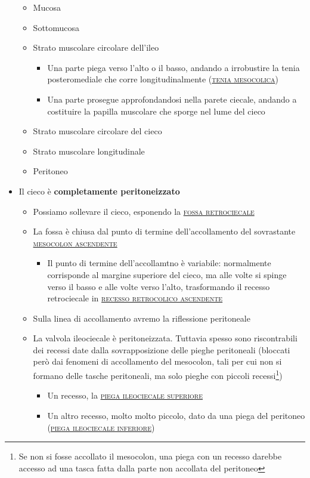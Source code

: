 \documentclass[italian,]{article}
\providecommand{\tightlist}{%
  \setlength{\itemsep}{0pt}\setlength{\parskip}{0pt}}
\renewcommand{\a}[1]{\underline{\textsc{#1}}}
\begin{document}
\begin{itemize}
  \begin{itemize}
  \tightlist
  \item
    Mucosa
  \item
    Sottomucosa
  \item
    Strato muscolare circolare dell'ileo

    \begin{itemize}
    \tightlist
    \item
      Una parte piega verso l'alto o il basso, andando a irrobustire la
      tenia posteromediale che corre longitudinalmente
      (\a{tenia mesocolica})
    \item
      Una parte prosegue approfondandosi nella parete ciecale, andando a
      costituire la papilla muscolare che sporge nel lume del cieco
    \end{itemize}
  \item
    Strato muscolare circolare del cieco
  \item
    Strato muscolare longitudinale
  \item
    Peritoneo
  \end{itemize}
\item
  Il cieco è \textbf{completamente peritoneizzato}

  \begin{itemize}
  \tightlist
  \item
    Possiamo sollevare il cieco, esponendo la \a{fossa retrociecale}
  \item
    La fossa è chiusa dal punto di termine dell'accollamento del
    sovrastante \a{mesocolon ascendente}

    \begin{itemize}
    \tightlist
    \item
      Il punto di termine dell'accollamtno è variabile: normalmente
      corrisponde al margine superiore del cieco, ma alle volte si
      spinge verso il basso e alle volte verso l'alto, trasformando il
      recesso retrociecale in \a{recesso retrocolico ascendente}
    \end{itemize}
  \item
    Sulla linea di accollamento avremo la riflessione peritoneale
  \item
    La valvola ileociecale è peritoneizzata. Tuttavia spesso sono
    riscontrabili dei recessi date dalla sovrapposizione delle pieghe
    peritoneali (bloccati però dai fenomeni di accollamento del
    mesocolon, tali per cui non si formano delle tasche peritoneali, ma
    solo pieghe con piccoli recessi\footnote{Se non si fosse accollato
      il mesocolon, una piega con un recesso darebbe accesso ad una
      tasca fatta dalla parte non accollata del peritoneo})

    \begin{itemize}
    \tightlist
    \item
      Un recesso, la \a{piega ileociecale superiore}
    \item
      Un altro recesso, molto molto piccolo, dato da una piega del
      peritoneo (\a{piega ileociecale inferiore})
    \end{itemize}
  \end{itemize}
\end{itemize}
\end{document}
